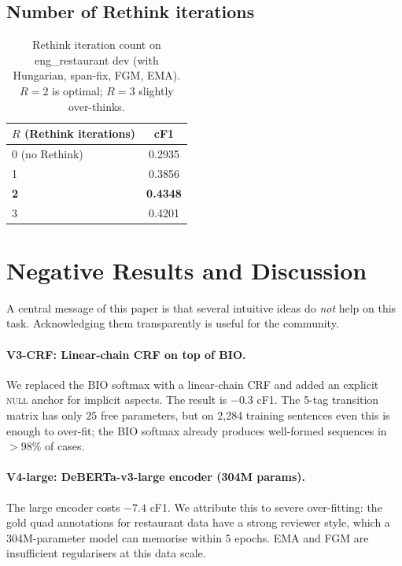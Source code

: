 \documentclass[11pt]{article}
\begin{document}
\subsection{Number of Rethink iterations}

\begin{table}[h]
\centering\small
\begin{tabular}{lc}
\toprule
$R$ (Rethink iterations) & cF1 \\
\midrule
0 (no Rethink) & 0.2935 \\
1 & 0.3856 \\
\textbf{2} & \textbf{0.4348} \\
3 & 0.4201 \\
\bottomrule
\end{tabular}
\caption{Rethink iteration count on eng\_restaurant dev (with
Hungarian, span-fix, FGM, EMA). $R{=}2$ is optimal; $R{=}3$
slightly over-thinks.}
\label{tab:rethink}
\end{table}

\section{Negative Results and Discussion}
\label{sec:negative}

A central message of this paper is that several intuitive ideas do
\emph{not} help on this task. Acknowledging them transparently is
useful for the community.

\paragraph{V3-CRF: Linear-chain CRF on top of BIO.}
We replaced the BIO softmax with a linear-chain CRF
\cite{lafferty2001crf} and added an explicit \textsc{null} anchor for
implicit aspects. The result is $-0.3$ cF1. The 5-tag transition
matrix has only $25$ free parameters, but on 2{,}284 training
sentences even this is enough to over-fit; the BIO softmax already
produces well-formed sequences in $\!>$$98\%$ of cases.

\paragraph{V4-large: DeBERTa-v3-large encoder (304M params).}
The large encoder costs $-7.4$ cF1. We attribute this to severe
over-fitting: the gold quad annotations for restaurant data have a
strong reviewer style, which a 304M-parameter model can memorise
within 5 epochs. EMA and FGM are insufficient regularisers at this
data scale.
\end{document}
